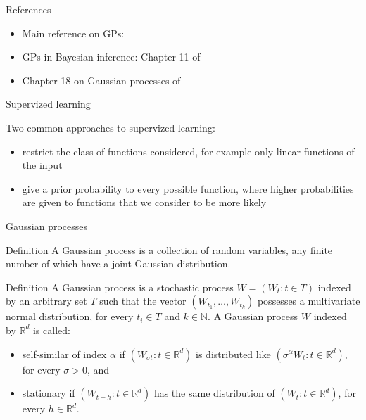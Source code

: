 \begin{frame}{References}
\begin{itemize}
	\item \alert{Main reference on GPs}: 
	\item \alert{GPs in Bayesian inference}: Chapter 11 of 
	\item \alert{Chapter 18} on Gaussian processes of 
\end{itemize}
\end{frame}




\begin{frame}{Supervized learning}

Two common approaches to \alert{supervized learning}:
\begin{itemize}
	\item restrict the class of functions considered, for example only linear functions of the input
	\item give a prior probability to every possible function, where higher probabilities are given to functions that we consider to be more likely
\end{itemize}

\end{frame}



\begin{frame}{Gaussian processes}
\begin{block}{Definition \citep{Rasmussen:2006aa}}
	A \alert{Gaussian process} is a collection of random variables, any finite number of which have a joint Gaussian distribution.
\end{block}

\pause

\begin{block}{Definition \citep{ghosal2017fundamentals}}
	A \alert{Gaussian process} is a stochastic process $W =(W_t: t \in T)$ indexed by an arbitrary set $T$ such that the vector $(W_{t_1},\ldots,W_{t_k})$ possesses a multivariate
normal distribution, for every $t_i\in T$ and $k\in \mathbb{N}$. A Gaussian process $W$ indexed by $\mathbb{R}^d$ is called:
\begin{itemize}
	\item  \alert{self-similar} of index $\alpha$ if $(W_{\sigma t}:t \in \mathbb{R}^d)$ is distributed like $(\sigma^\alpha W_{t}:t \in \mathbb{R}^d)$, for every $\sigma  > 0$, and 
	\item \alert{stationary} if $(W_{t+h}:t \in \mathbb{R}^d)$  has the same distribution of $(W_{t}:t \in \mathbb{R}^d)$, for every $h\in \mathbb{R}^d$.
\end{itemize}
\end{block}

\end{frame}



